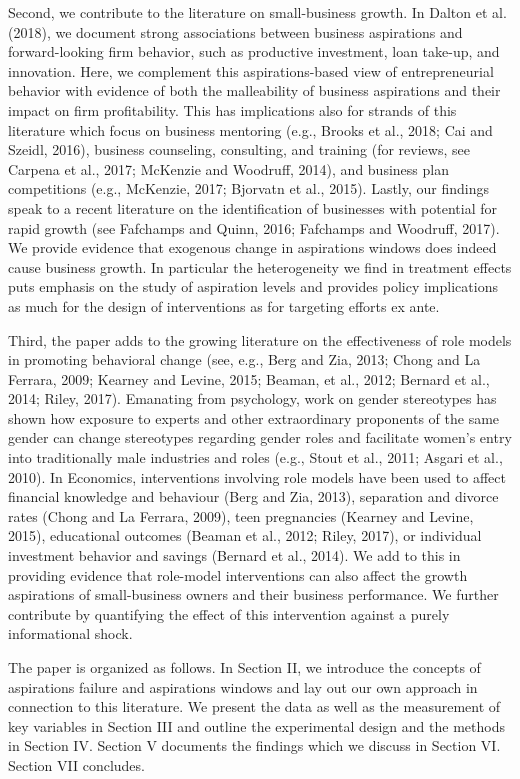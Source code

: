 \documentclass[11.5pt]{article}
\begin{document}
{Second, we contribute to the literature on small-business growth. In Dalton et al. (2018), we document strong associations between business aspirations and forward-looking firm behavior, such as productive investment, loan take-up, and innovation. Here, we complement this aspirations-based view of entrepreneurial behavior with evidence of both the malleability of business aspirations and their impact on firm profitability. This has implications also for strands of this literature which focus on business mentoring (e.g., Brooks et al., 2018; Cai and Szeidl, 2016), business counseling, consulting, and training (for reviews, see Carpena et al., 2017; McKenzie and Woodruff, 2014), and business plan competitions (e.g., McKenzie, 2017; Bjorvatn et al., 2015). Lastly, our findings speak to a recent literature on the identification of businesses with potential for rapid growth (see Fafchamps and Quinn, 2016; Fafchamps and Woodruff, 2017). We provide evidence that exogenous change in aspirations windows does indeed cause business growth. In particular the heterogeneity we find in treatment effects puts emphasis on the study of aspiration levels and provides policy implications as much for the design of interventions as for targeting efforts ex ante.

Third, the paper adds to the growing literature on the effectiveness of role models in promoting behavioral change (see, e.g., Berg and Zia, 2013; Chong and La Ferrara, 2009; Kearney and Levine, 2015; Beaman, et al., 2012; Bernard et al., 2014; Riley, 2017). Emanating from psychology, work on gender stereotypes has shown how exposure to experts and other extraordinary proponents of the same gender  can change stereotypes regarding gender roles and facilitate women's entry into traditionally male industries and roles (e.g., Stout et al., 2011; Asgari et al., 2010). In Economics, interventions involving role models have been used to affect financial knowledge and behaviour (Berg and Zia, 2013), separation and divorce rates (Chong and La Ferrara, 2009), teen pregnancies (Kearney and Levine, 2015), educational outcomes (Beaman et al., 2012; Riley, 2017), or individual investment behavior and savings (Bernard et al., 2014). We add to this in providing evidence that role-model interventions can also affect the growth aspirations of small-business owners and their business performance. We further contribute by quantifying the effect of this intervention against a purely informational shock.

The paper is organized as follows. In Section II, we introduce the concepts of aspirations failure and aspirations windows and lay out our own approach in connection to this literature. We present the data as well as the measurement of key variables in Section III and outline the experimental design and the methods in Section IV. Section V documents the findings which we discuss in Section VI. Section VII concludes.

}
\end{document}
